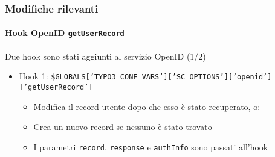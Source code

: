 \begin{frame}[fragile]
	\frametitle{Modifiche rilevanti}
	\framesubtitle{Hook OpenID \texttt{getUserRecord}}

	\lstset{basicstyle=\tiny\ttfamily}

	Due hook sono stati aggiunti al servizio OpenID (1/2)

		\begin{itemize}

			\item Hook 1:\newline
				\smaller\smaller
					\texttt{\$GLOBALS['TYPO3\_CONF\_VARS']['SC\_OPTIONS']['openid']['getUserRecord']}
				\normalsize

				\begin{itemize}
					\item Modifica il record utente dopo che esso è stato recuperato, o:
					\item Crea un nuovo record se nessuno è stato trovato
					\item I parametri \texttt{record}, \texttt{response} e \texttt{authInfo} sono passati all'hook
				\end{itemize}

		\end{itemize}

\end{frame}

